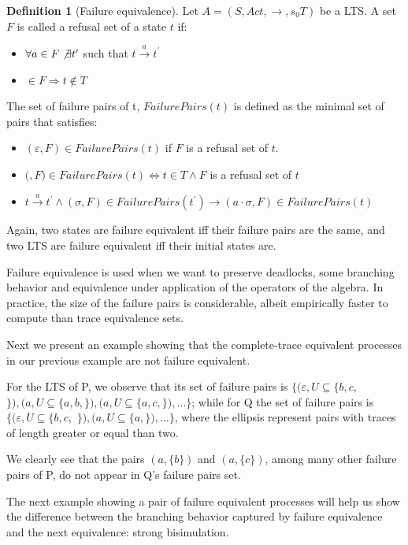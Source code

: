 \documentclass[11pt]{article}
\newcommand{\cmark}{\ding{51}}
\theoremstyle{definition}
\newtheorem{definition}{Definition}
\theoremstyle{plain}
\begin{document}
\begin{definition} [Failure equivalence]
	Let $ A = (S, Act, \rightarrow, s_0 T) $ be a LTS. A set $ F $ is called a refusal set of a state $ t $ if:
	\begin{itemize}
		\item $ \forall a \in F \not \exists t^\prime $ such that $ t\xrightarrow{a}t^\prime  $
		\item \cmark $ \in F \Rightarrow t \not \in T$
	\end{itemize}
	The set of failure pairs of t, $ FailurePairs(t) $ is defined as the minimal set of pairs that satisfies:
	\begin{itemize}
		\item $ (\varepsilon, F) \in FailurePairs(t) $ if $ F $ is a refusal set of $ t $.
		\item $($\cmark$, F) \in FailurePairs(t) \iff t \in T \wedge F $ is a refusal set of $ t $
		\item $t\xrightarrow{a}t^\prime  \wedge (\sigma, F) \in FailurePairs(t^\prime ) \rightarrow (a\cdot\sigma, F) \in FailurePairs(t)$
	\end{itemize}
\end{definition} 
Again, two states are failure equivalent iff their failure pairs are the same, and two LTS are failure equivalent iff their initial states are.

Failure equivalence is used when we want to preserve deadlocks, some branching behavior and equivalence under application of the operators of the algebra. In practice, the size of the failure pairs is considerable, albeit empirically faster to compute than trace equivalence sets. \cite{valmari1995failure}

Next we present an example showing that the complete-trace equivalent processes in our previous example are not failure equivalent.

For the LTS of P, we observe that its set of failure pairs is $ \{(\varepsilon,U\subseteq\{b,c,$ \cmark $\}), (a,U\subseteq\{a,b,$\cmark$\}), (a,U\subseteq\{a,c,$\cmark$\}), \dots\} $; while for Q the set of failure pairs is $ \{(\varepsilon,U\subseteq\{b,c,$ \cmark $\}), (a,U\subseteq\{a,$\cmark$\}), \dots\} $, where the ellipsis represent pairs with traces of length greater or equal than two.

We clearly see that the pairs $ (a,\{b\}) $ and $ (a,\{c\}) $, among many other failure pairs of P, do not appear in Q's failure pairs set.

The next example showing a pair of failure equivalent processes will help us show the difference between the branching behavior captured by failure equivalence and the next equivalence: strong bisimulation.
\end{document}
